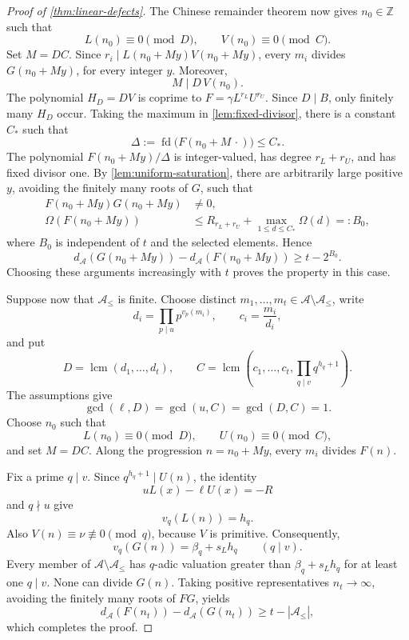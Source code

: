 \documentclass[11pt]{amsart}
\newcommand{\Z}{\mathbb Z}
\newcommand{\fd}{\operatorname{fd}}
\newcommand{\lcm}{\operatorname{lcm}}
\theoremstyle{definition}
\begin{document}
\begin{proof}[Proof of \cref{thm:linear-defects}]
The Chinese remainder theorem now gives \(n_0\in\Z\) such that
\[
  L(n_0)\equiv0\pmod D,\qquad
  V(n_0)\equiv0\pmod C.
\]
Set \(M=DC\).  Since \(r_i\mid L(n_0+My)V(n_0+My)\), every \(m_i\) divides
\(G(n_0+My)\), for every integer \(y\).  Moreover,
\[
  M\mid D\,V(n_0).
\]
The polynomial \(H_D=D V\) is coprime to
\(F=\gamma L^{r_L}U^{r_U}\).  Since \(D\mid B\), only finitely many
\(H_D\) occur.  Taking the maximum in
\cref{lem:fixed-divisor}, there is a constant \(C_*\) such that
\[
  \Delta:=\fd\bigl(F(n_0+M\,\cdot)\bigr)\le C_*.
\]
The polynomial \(F(n_0+My)/\Delta\) is integer-valued, has degree
\(r_L+r_U\), and has fixed divisor one.  By
\cref{lem:uniform-saturation}, there are
arbitrarily large positive \(y\), avoiding the finitely many roots of \(G\),
such that
\[
  \begin{aligned}
    F(n_0+My)G(n_0+My)&\ne0,\\
    \Omega(F(n_0+My))
      &\le R_{r_L+r_U}+\max_{1\le d\le C_*}\Omega(d)=:B_0,
  \end{aligned}
\]
where \(B_0\) is independent of \(t\) and the selected elements.  Hence
\[
  d_{\mathcal A}(G(n_0+My))-d_{\mathcal A}(F(n_0+My))
  \ge t-2^{B_0}.
\]
Choosing these arguments increasingly with \(t\) proves the property in this
case.

Suppose now that \(\mathcal A_{\le}\) is finite.  Choose distinct
\(m_1,\ldots,m_t\in\mathcal A\setminus\mathcal A_{\le}\), write
\[
  d_i=\prod_{p\mid u}p^{v_p(m_i)},\qquad
  c_i=\frac{m_i}{d_i},
\]
and put
\[
  D=\lcm(d_1,\ldots,d_t),\qquad
  C=\lcm\left(c_1,\ldots,c_t,
      \prod_{q\mid v}q^{h_q+1}\right).
\]
The assumptions give
\[
  \gcd(\ell,D)=\gcd(u,C)=\gcd(D,C)=1.
\]
Choose \(n_0\) such that
\[
  L(n_0)\equiv0\pmod D,\qquad
  U(n_0)\equiv0\pmod C,
\]
and set \(M=DC\).  Along the progression \(n=n_0+My\), every \(m_i\)
divides \(F(n)\).

Fix a prime \(q\mid v\).  Since \(q^{h_q+1}\mid U(n)\), the identity
\[
  uL(x)-\ell U(x)=-R
\]
and \(q\nmid u\) give
\[
  v_q(L(n))=h_q.
\]
Also \(V(n)\equiv\nu\not\equiv0\pmod q\), because \(V\) is primitive.
Consequently,
\[
  v_q(G(n))=\beta_q+s_Lh_q\qquad(q\mid v).
\]
Every member of \(\mathcal A\setminus\mathcal A_{\le}\) has
\(q\)-adic valuation greater than \(\beta_q+s_Lh_q\) for at least one
\(q\mid v\).
None can divide \(G(n)\).  Taking positive representatives
\(n_t\to\infty\), avoiding the finitely many roots of \(FG\), yields
\[
  d_{\mathcal A}(F(n_t))-d_{\mathcal A}(G(n_t))
  \ge t-|\mathcal A_{\le}|,
\]
which completes the proof.
\end{proof}
\end{document}
